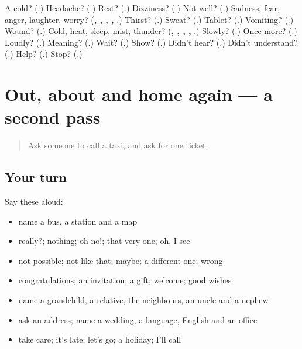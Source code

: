 \begin{tcolorbox}[breakable,colback=teal!4,colframe=teal!35!black,title={Before you move on}]
A cold? (\textbf{}.) Headache? (\textbf{}.) Rest? (\textbf{}.) Dizziness? (\textbf{}.) Not well? (\textbf{}.) Sadness, fear, anger, laughter, worry? (\textbf{, , , , }.) Thirst? (\textbf{}.) Sweat? (\textbf{}.) Tablet? (\textbf{}.) Vomiting? (\textbf{}.) Wound? (\textbf{}.) Cold, heat, sleep, mist, thunder? (\textbf{, , , , }.) Slowly? (\textbf{}.) Once more? (\textbf{}.) Loudly? (\textbf{}.) Meaning? (\textbf{}.) Wait? (\textbf{}.) Show? (\textbf{}.) Didn't hear? (\textbf{}.) Didn't understand? (\textbf{}.) Help? (\textbf{}.) Stop? (\textbf{}.)
\end{tcolorbox}
\section[(dialogue)]{Out, about and home again — a second pass}

\label{lesson:ML-R127-second-pass-travel-replies-people}



\begin{quote}
Ask someone to call a taxi, and ask for one ticket.
\end{quote}

\subsection*{Your turn}
Say these aloud:

\begin{itemize}
\raggedright
  \item name a bus, a station and a map
  \item really?; nothing; oh no!; that very one; oh, I see
  \item not possible; not like that; maybe; a different one; wrong
  \item congratulations; an invitation; a gift; welcome; good wishes
  \item name a grandchild, a relative, the neighbours, an uncle and a nephew
  \item ask an address; name a wedding, a language, English and an office
  \item take care; it's late; let's go; a holiday; I'll call
\end{itemize}

